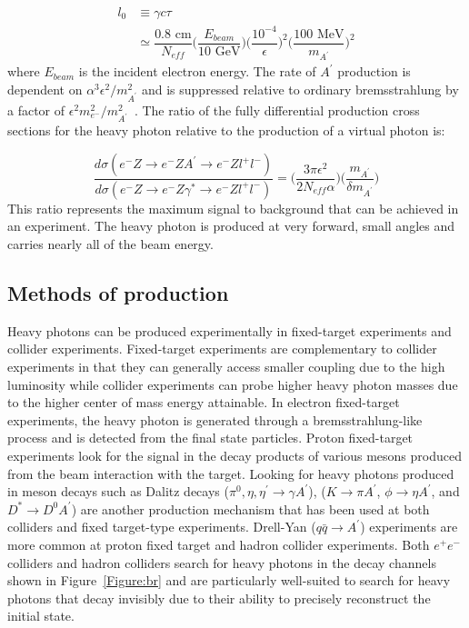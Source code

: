 \begin{equation}
	\label{eq:decayL}
	\begin{split}
	l_0 &\equiv \gamma c \tau \\
	&\simeq \dfrac{0.8\textrm{ cm}}{N_{eff}}\Big(\dfrac{E_{beam}}{10\textrm{ GeV}}\Big)\Big({\dfrac{10^{-4}}{\epsilon}}\Big)^2\Big(\dfrac{100\textrm{ MeV}}{m_{A^{\prime}}}\Big)^2
	\end{split}
\end{equation}
where $E_{beam}$ is the incident electron energy. The rate of $A^{\prime}$ production is dependent on $\alpha^3\epsilon^2/m_{A^{\prime}}^2$ and is suppressed relative to ordinary bremsstrahlung by a factor of $\epsilon^2m_{e^-}^2/m_{A^{\prime}}^2$~\cite{bjorken_new_2009}. The ratio of the fully differential production cross sections for the heavy photon relative to the production of a virtual photon is:

\begin{equation}
	\label{eq:production}
	\dfrac{d\sigma(e^-Z\rightarrow e^-ZA^{\prime}\rightarrow e^-Zl^+l^-)}{d\sigma(e^-Z\rightarrow e^-Z\gamma^{\ast}\rightarrow e^-Zl^+l^-)} = \Big(\dfrac{3\pi\epsilon^2}{2N_{eff}\alpha}\Big) \Big(\dfrac{m_{A^{\prime}}}{\delta m_{A^{\prime}}}\Big)
\end{equation}
This ratio represents the maximum signal to background that can be achieved in an experiment. The heavy photon is produced at very forward, small angles and carries nearly all of the beam energy. \\

\subsection{Methods of production}
Heavy photons can be produced experimentally in fixed-target experiments and collider experiments. Fixed-target experiments are complementary to collider experiments in that they can generally access smaller coupling due to the high luminosity while collider experiments can probe higher heavy photon masses due to the higher center of mass energy attainable. In electron fixed-target experiments, the heavy photon is generated through a bremsstrahlung-like process and is detected from the final state particles. Proton fixed-target experiments look for the signal in the decay products of various mesons produced from the beam interaction with the target. Looking for heavy photons produced in meson decays such as Dalitz decays ($\pi^0, \eta, \eta^{\prime}\rightarrow \gamma A^{\prime}$), ($K\rightarrow\pi A^{\prime} $, $\phi\rightarrow\eta A^{\prime}$, and $D^{\ast}\rightarrow D^{0}A^{\prime}$) are another production mechanism that has been used at both colliders and fixed target-type experiments. Drell-Yan ($q\bar{q}\rightarrow A^{\prime}$) experiments are more common at proton fixed target and hadron collider experiments. Both $e^+e^-$ colliders and hadron colliders search for heavy photons in the decay channels shown in Figure~\ref{Figure:br} and are particularly well-suited to search for heavy photons that decay invisibly due to their ability to precisely reconstruct the initial state. 

